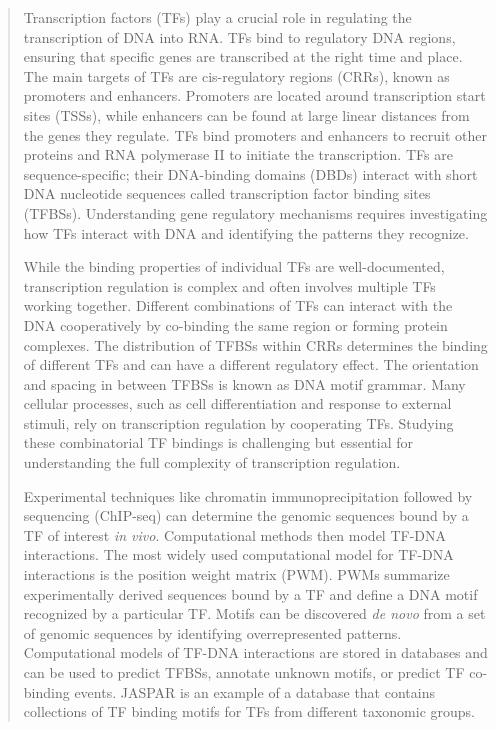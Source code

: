 \begin{abstract}

    Transcription factors (TFs) play a crucial role in regulating the transcription of DNA into RNA. TFs bind to regulatory DNA regions, ensuring that specific genes are transcribed at the right time and place. The main targets of TFs are cis-regulatory regions (CRRs), known as promoters and enhancers. Promoters are located around transcription start sites (TSSs), while enhancers can be found at large linear distances from the genes they regulate. TFs bind promoters and enhancers to recruit other proteins and RNA polymerase II to initiate the transcription. TFs are sequence-specific; their DNA-binding domains (DBDs) interact with short DNA nucleotide sequences called transcription factor binding sites (TFBSs). Understanding gene regulatory mechanisms requires investigating how TFs interact with DNA and identifying the patterns they recognize.

    While the binding properties of individual TFs are well-documented, transcription regulation is complex and often involves multiple TFs working together. Different combinations of TFs can interact with the DNA cooperatively by co-binding the same region or forming protein complexes. The distribution of TFBSs within CRRs determines the binding of different TFs and can have a different regulatory effect. The orientation and spacing in between TFBSs is known as DNA motif grammar. Many cellular processes, such as cell differentiation and response to external stimuli, rely on transcription regulation by cooperating TFs. Studying these combinatorial TF bindings is challenging but essential for understanding the full complexity of transcription regulation.

    Experimental techniques like chromatin immunoprecipitation followed by sequencing (ChIP-seq) can determine the genomic sequences bound by a TF of interest \textit{in vivo}. Computational methods then model TF-DNA interactions. The most widely used computational model for TF-DNA interactions is the position weight matrix (PWM). PWMs summarize experimentally derived sequences bound by a TF and define a DNA motif recognized by a particular TF. Motifs can be discovered \textit{de novo} from a set of genomic sequences by identifying overrepresented patterns. Computational models of TF-DNA interactions are stored in databases and can be used to predict TFBSs, annotate unknown motifs, or predict TF co-binding events. JASPAR is an example of a database that contains collections of TF binding motifs for TFs from different taxonomic groups.


\end{abstract}
